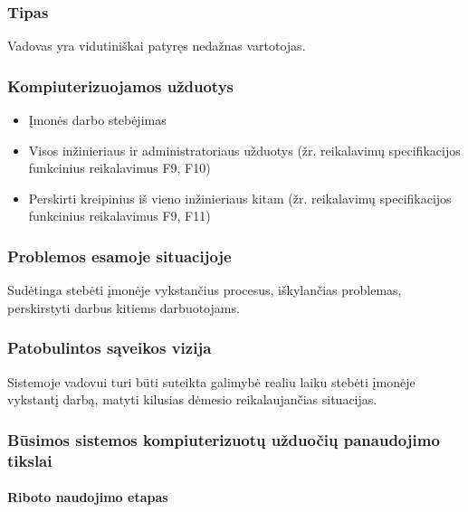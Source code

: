 		\subsubsection{Tipas}
		
		Vadovas yra vidutiniškai patyręs nedažnas vartotojas.
		
		\subsubsection{Kompiuterizuojamos užduotys}
		
		\begin{itemize}
			\item Įmonės darbo stebėjimas
			\item Visos inžinieriaus ir administratoriaus užduotys (žr. reikalavimų specifikacijos funkcinius reikalavimus F9, F10)
			\item Perskirti kreipinius iš vieno inžinieriaus kitam (žr. reikalavimų specifikacijos funkcinius reikalavimus F9, F11)
		\end{itemize}
		
		\subsubsection{Problemos esamoje situacijoje}
		
		Sudėtinga stebėti įmonėje vykstančius procesus, iškylančias problemas, perskirstyti darbus kitiems darbuotojams.
		
		\subsubsection{Patobulintos sąveikos vizija}
		
		Sistemoje vadovui turi būti suteikta galimybė realiu laiku stebėti įmonėje vykstantį darbą, matyti kilusias dėmesio reikalaujančias situacijas.
		
		\subsubsection{Būsimos sistemos kompiuterizuotų užduočių panaudojimo tikslai}
		
			\setcounter{tocdepth}{5} \setcounter{secnumdepth}{5}
			
			\paragraph{Riboto naudojimo etapas}
			
